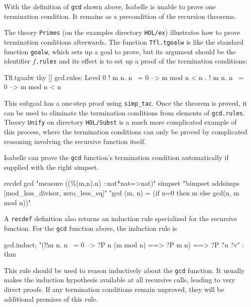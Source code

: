With the definition of \texttt{gcd} shown above, Isabelle is unable to prove
one termination condition.  It remains as a precondition of the recursion
theorems.  
The theory \texttt{Primes} (on the examples directory \texttt{HOL/ex})
illustrates how to prove termination conditions afterwards.  The function
\texttt{Tfl.tgoalw} is like the standard function \texttt{goalw}, which sets
up a goal to prove, but its argument should be the identifier
$f$\texttt{.rules} and its effect is to set up a proof of the termination
conditions: 
\begin{ttbox}
Tfl.tgoalw thy [] gcd.rules;
{\out Level 0}
{\out ! m n. n ~= 0 --> m mod n < n}
{. ! m n. n ~= 0 --> m mod n < n}
\end{ttbox}
This subgoal has a one-step proof using \texttt{simp_tac}.  Once the theorem
is proved, it can be used to eliminate the termination conditions from
elements of \texttt{gcd.rules}.  Theory \texttt{Unify} on directory
\texttt{HOL/Subst} is a much more complicated example of this process, where
the termination conditions can only be proved by complicated reasoning
involving the recursive function itself.

Isabelle can prove the \texttt{gcd} function's termination condition
automatically if supplied with the right simpset.
\begin{ttbox}
recdef gcd "measure ((\%(m,n).n) ::nat*nat=>nat)"
  simpset "!simpset addsimps [mod_less_divisor, zero_less_eq]"
    "gcd (m, n) = (if n=0 then m else gcd(n, m mod n))"
\end{ttbox}

A \texttt{recdef} definition also returns an induction rule specialized for
the recursive function.  For the \texttt{gcd} function above, the induction
rule is
\begin{ttbox}
gcd.induct;
{\out "(!!m n. n ~= 0 --> ?P n (m mod n) ==> ?P m n) ==> ?P ?u ?v" : thm}
\end{ttbox}
This rule should be used to reason inductively about the \texttt{gcd}
function.  It usually makes the induction hypothesis available at all
recursive calls, leading to very direct proofs.  If any termination
conditions remain unproved, they will be additional premises of this rule.



